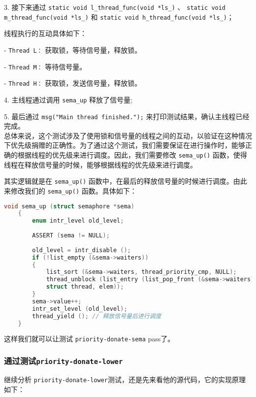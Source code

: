 \documentclass{article}
\begin{document}
	3. 接下来通过 \texttt{static void l\_thread\_func(void *ls\_)} 、 \texttt{static void m\_thread\_func(void *ls\_)} 和 \texttt{static void h\_thread\_func(void *ls\_)}；
	
	线程执行的互动具体如下：
	
	- \texttt{Thread L：} 获取锁，等待信号量，释放锁。
	
	- \texttt{Thread M：} 等待信号量。
	
	- \texttt{Thread H：} 获取锁，发送信号量，释放锁。
	
	4. 主线程通过调用 \texttt{sema\_up} 释放了信号量;
	
	5. 最后通过 \texttt{msg("Main thread finished.");} 来打印测试结果，确认主线程已经完成。\\[1em]
	
	总体来说，这个测试涉及了使用锁和信号量的线程之间的互动，以验证在这种情况下优先级捐赠的正确性。为了通过这个测试，我们需要保证在进行操作时，能够正确的根据线程的优先级来进行调度。因此，我们需要修改 \texttt{sema\_up()} 函数，使得线程在释放信号量的时候，能够根据线程的优先级来进行调度。
	
	其实逻辑就是在 \texttt{sema\_up()} 函数中，在最后的释放信号量的时候进行调度。由此来修改我们的 \texttt{sema\_up()} 函数。具体如下：
	
	\begin{lstlisting}[language=C, title=修改后的\texttt{sema\_up()}函数]
    void sema_up (struct semaphore *sema) 
    {
    	enum intr_level old_level;
    	
    	ASSERT (sema != NULL);
    	
    	old_level = intr_disable ();
    	if (!list_empty (&sema->waiters)) 
    	{
    		list_sort (&sema->waiters, thread_priority_cmp, NULL);
    		thread_unblock (list_entry (list_pop_front (&sema->waiters),
    		struct thread, elem));
    	}
    	sema->value++;
    	intr_set_level (old_level);
    	thread_yield (); // 释放信号量后进行调度
    }
	\end{lstlisting}
	
	这样我们就可以让测试 \texttt{priority-donate-sema} pass了。
	
	\subsubsection{通过测试\texttt{priority-donate-lower}}
	
	继续分析 \texttt{priority-donate-lower}测试，还是先来看他的源代码，它的实现原理如下：
	
\end{document}
